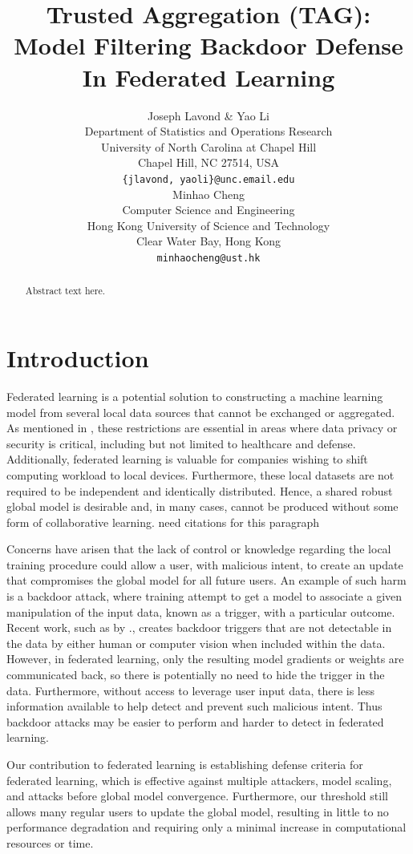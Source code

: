 \documentclass{article} %
\title{
    Trusted Aggregation (TAG): Model Filtering Backdoor Defense In Federated Learning
}
\author{%
    Joseph Lavond \& Yao Li  \\
    Department of Statistics and Operations Research \\
    University of North Carolina at Chapel Hill \\
    Chapel Hill, NC 27514, USA \\
    \texttt{\{jlavond, yaoli\}@unc.email.edu} \\
    \And
    Minhao Cheng \\
    Computer Science and Engineering \\
    Hong Kong University of Science and Technology \\
    Clear Water Bay, Hong Kong \\
    \texttt{minhaocheng@ust.hk}
}
\newcommand{\yli}[1]{{\color{cyan}#1}}
\begin{document}
\maketitle

\begin{abstract}
Abstract text here.
\end{abstract}



\section{Introduction}

Federated learning is a potential solution to constructing a machine learning model from several local data sources that cannot be exchanged or aggregated. As mentioned in \cite{fed-learn}, these restrictions are essential in areas where data privacy or security is critical, including but not limited to healthcare and defense. Additionally, federated learning is valuable for companies wishing to shift computing workload to local devices. Furthermore, these local datasets are not required to be independent and identically distributed. Hence, a shared robust global model is desirable and, in many cases, cannot be produced without some form of collaborative learning. \yli{need citations for this paragraph}


Concerns have arisen that the lack of control or knowledge regarding the local training procedure could allow a user, with malicious intent, to create an update that compromises the global model for all future users. An example of such harm is a backdoor attack, where training attempt to get a model to associate a given manipulation of the input data, known as a trigger, with a particular outcome. Recent work, such as by \cite{stamp-invisible}., creates backdoor triggers that are not detectable in the data by either human or computer vision when included within the data. However, in federated learning, only the resulting model gradients or weights are communicated back, so there is potentially no need to hide the trigger in the data. Furthermore, without access to leverage user input data, there is less information available to help detect and prevent such malicious intent. Thus backdoor attacks may be easier to perform and harder to detect in federated learning.

Our contribution to federated learning is establishing defense criteria for federated learning, which is effective against multiple attackers, model scaling, and attacks before global model convergence. Furthermore, our threshold still allows many regular users to update the global model, resulting in little to no performance degradation and requiring only a minimal increase in computational resources or time.
\end{document}
